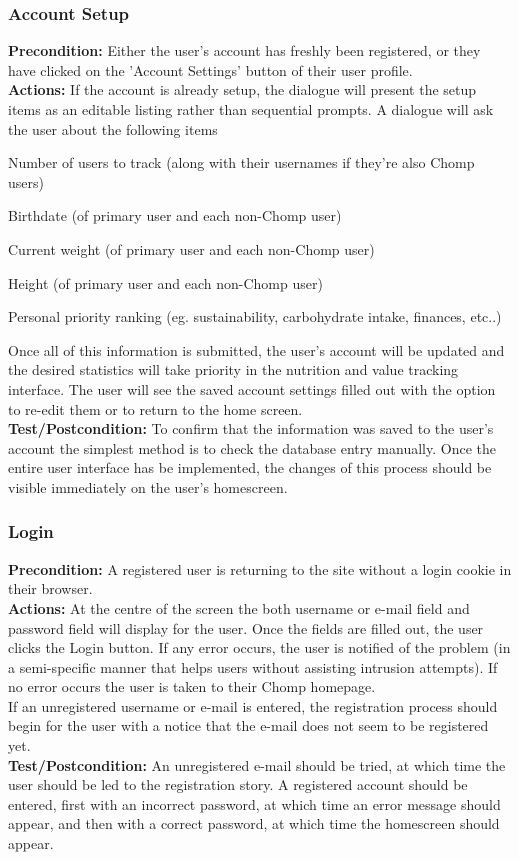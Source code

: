 \documentclass[a4paper,12pt]{article}
\begin{document}
\subsubsection{Account Setup}
\textbf{Precondition:} Either the user's account has freshly been registered, or they have clicked on the 'Account Settings' button of their user profile.\\
\textbf{Actions:} If the account is already setup, the dialogue will present the setup items as an editable listing rather than sequential prompts.  A dialogue will ask the user about the following items\begin{list}{•}{•}
\item Number of users to track (along with their usernames if they're also Chomp users)
\item Birthdate (of primary user and each non-Chomp user)
\item Current weight (of primary user and each non-Chomp user)
\item Height (of primary user and each non-Chomp user)
\item Personal priority ranking (eg. sustainability, carbohydrate intake, finances, etc..)
\end{list}
Once all of this information is submitted, the user's account will be updated and the desired statistics will take priority in the nutrition and value tracking interface.  The user will see the saved account settings filled out with the option to re-edit them or to return to the home screen.\\
\textbf{Test/Postcondition:} To confirm that the information was saved to the user's account the simplest method is to check the database entry manually.  Once the entire user interface has be implemented, the changes of this process should be visible immediately on the user's homescreen.
\subsubsection{Login}
\textbf{Precondition:} A registered user is returning to the site without a login cookie in their browser.\\
\textbf{Actions:} At the centre of the screen the both username or e-mail field and password field will display for the user.  Once the fields are filled out, the user clicks the Login button.  If any error occurs, the user is notified of the problem (in a semi-specific manner that helps users without assisting intrusion attempts).  If no error occurs the user is taken to their Chomp homepage.\\
If an unregistered username or e-mail is entered, the registration process should begin for the user with a notice that the e-mail does not seem to be registered yet.\\
\textbf{Test/Postcondition:} An unregistered e-mail should be tried, at which time the user should be led to the registration story.  A registered account should be entered, first with an incorrect password, at which time an error message should appear, and then with a correct password, at which time the homescreen should appear.
\end{document}
